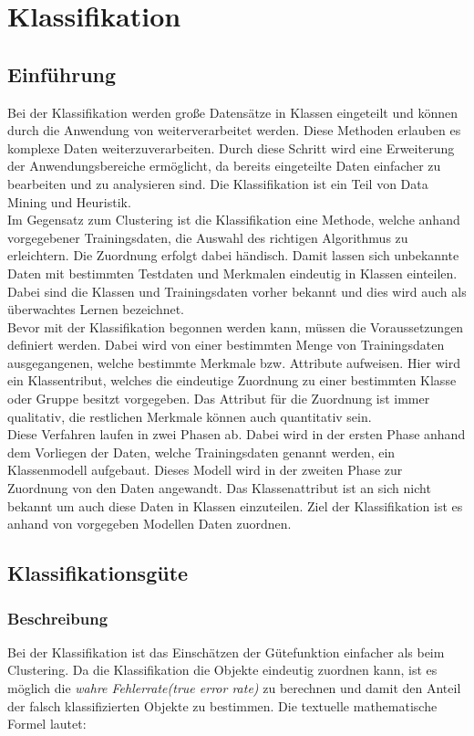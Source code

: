 

\chapter{Klassifikation}\label{Klassifikation}
\section{Einführung}
Bei der Klassifikation werden große Datensätze in Klassen eingeteilt und können durch die Anwendung von  weiterverarbeitet werden. Diese Methoden erlauben es komplexe Daten  weiterzuverarbeiten. Durch diese Schritt wird eine Erweiterung der Anwendungsbereiche ermöglicht, da  bereits eingeteilte Daten einfacher zu bearbeiten und zu analysieren sind. Die Klassifikation ist ein Teil von Data Mining und Heuristik.\\
Im Gegensatz zum Clustering ist die Klassifikation eine Methode, welche anhand vorgegebener Trainingsdaten, die Auswahl des richtigen Algorithmus zu erleichtern. Die Zuordnung erfolgt dabei händisch. Damit lassen sich unbekannte Daten mit bestimmten Testdaten und Merkmalen eindeutig in Klassen einteilen. Dabei sind die Klassen und Trainingsdaten vorher bekannt und dies wird auch als überwachtes Lernen bezeichnet. \cite {mitch97}\\
Bevor mit der Klassifikation begonnen werden kann, müssen die Voraussetzungen definiert werden. Dabei wird von einer bestimmten Menge von Trainingsdaten ausgegangenen, welche bestimmte Merkmale bzw. Attribute aufweisen. Hier wird ein Klassentribut, welches die eindeutige Zuordnung zu einer bestimmten Klasse oder Gruppe besitzt  vorgegeben. Das Attribut für die Zuordnung ist immer qualitativ, die restlichen Merkmale können auch quantitativ sein.\cite {mitch97} \\

Diese Verfahren laufen in zwei Phasen ab. Dabei wird in der ersten Phase anhand dem Vorliegen der Daten, welche Trainingsdaten genannt werden, ein Klassenmodell aufgebaut. Dieses Modell wird in der zweiten Phase zur Zuordnung von den Daten angewandt. Das Klassenattribut ist an sich nicht bekannt um auch diese Daten in Klassen einzuteilen. Ziel der Klassifikation ist es anhand von vorgegeben Modellen  Daten zuordnen. \cite {mitch97}

\section{Klassifikationsgüte}
\subsection{Beschreibung}
Bei der Klassifikation ist das Einschätzen der Gütefunktion einfacher als beim Clustering. Da die Klassifikation die Objekte eindeutig zuordnen kann, ist es möglich die \textit{wahre Fehlerrate(true error rate)} zu berechnen und damit den Anteil der falsch klassifizierten Objekte zu bestimmen. Die textuelle mathematische Formel lautet: \\

